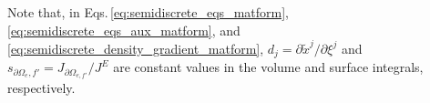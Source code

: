 Note that, 
in Eqs.\,\eqref{eq:semidiscrete_eqs_matform}, \eqref{eq:semidiscrete_eqs_aux_matform}, and \eqref{eq:semidiscrete_density_gradient_matform}, 
$d_j=\partial \tilde{x}^j/\partial \xi^j$ 
and 
$s_{\partial \Omega_e,f'} =J_{\partial \Omega_{e,f'}}/J^E$ 
are constant values in the volume and surface integrals, respectively. 

